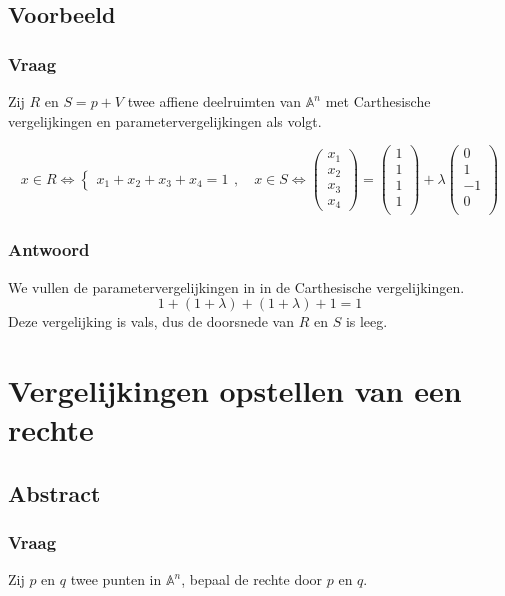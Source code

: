 \documentclass[main.tex]{subfiles}
\begin{document}
\subsection*{Voorbeeld}
\subsubsection*{Vraag}
\begin{center}
  Zij $R$ en $S=p+V$ twee affiene deelruimten van $\mathbb{A}^{n}$ met Carthesische vergelijkingen en parametervergelijkingen als volgt.
\end{center}
\[
x\in R \Leftrightarrow
\left\{
  \begin{array}{c}
    x_{1}+x_{2}+x_{3}+x_{4}=1
  \end{array}
\right.
,\quad
x\in S \Leftrightarrow
\begin{pmatrix}x_{1}\\x_{2}\\x_{3}\\x_{4}\end{pmatrix}
=
\begin{pmatrix}1\\1\\1\\1\\\end{pmatrix}
+\lambda
\begin{pmatrix}0\\1\\-1\\0\\\end{pmatrix}
\]

\subsubsection*{Antwoord}
We vullen de parametervergelijkingen in in de Carthesische vergelijkingen.
\[ 1+(1+\lambda)+(1+\lambda) + 1 = 1 \]
Deze vergelijking is vals, dus de doorsnede van $R$ en $S$ is leeg.

\newpage
\section{Vergelijkingen opstellen van een rechte}
\subsection*{Abstract}
\subsubsection*{Vraag}
\begin{center}
  Zij $p$ en $q$ twee punten in $\mathbb{A}^{n}$, bepaal de rechte door $p$ en $q$.
\end{center}
\end{document}
